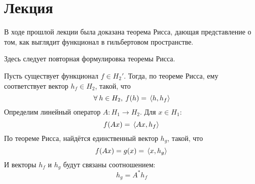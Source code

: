 \documentclass[12pt]{article}
\begin{document}
	\section{Лекция}
	
	В ходе прошлой лекции была доказана теорема Рисса, дающая представление о том, как выглядит функционал в гильбертовом пространстве.
	
	{\color{gray}
		Здесь следует повторная формулировка теоремы Рисса.
	}
	
	Пусть существует функционал $f \in H_2'$. Тогда, по теореме Рисса, ему соответствует вектор $h_f \in H_2$, такой, что 
	$$\forall h \in H_2, \: f(h) = \scal{h}{h_f}$$
	Определим линейный оператор $A : H_1 \rightarrow H_2$. Для $x \in H_1$: 
	$$f(Ax) = \, \langle Ax, h_f \rangle \,$$
	По теореме Рисса, найдётся единственный вектор $h_g$, такой, что 
	$$f(Ax) = g(x) = \, \langle x, h_g \rangle \,$$
	И векторы $h_f$ и $h_g$ будут связаны соотношением:
	$$h_g = A^{*}h_f$$
	
	\begin{state}
	\end{state}
\end{document}
